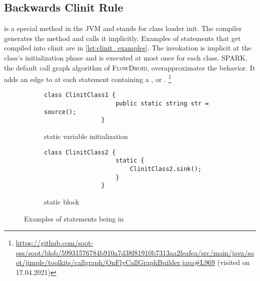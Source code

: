 \documentclass[../draft.tex]{subfiles}
\begin{document}
    \subsection{Backwards Clinit Rule}\label{s:clinitrule}
     is a special method in the JVM and stands for class loader init.
    The compiler generates the method and calls it implicitly. Examples of statements that get compiled into clinit are in \autoref{lst:clinit_examples}.
    The invokation is implicit at the class's initialization phase and is executed at most once for each class\footnotemark{}.
    SPARK, the default call graph algorithm of \textsc{FlowDroid}, overapproximates the  behavior.
    It adds an edge to  at each statement containing a ,  or \footnotemark{}.
    \footnote{\url{https://github.com/soot-oss/soot/blob/59931576784b910a7d38f81910b7313aa2feafea/src/main/java/soot/jimple/toolkits/callgraph/OnFlyCallGraphBuilder.java\#L969} (visited on 17.04.2021)}

    \begin{figure}[tbp]
        \centering
        \begin{subfigure}[b]{0.45\textwidth}
            \centering
            \begin{lstlisting}[gobble=16]
                class ClinitClass1 {
                    public static string str = source();
                }
            \end{lstlisting}
            \caption{static variable initialization}
            \label{lst:clinit_examples_a}
        \end{subfigure}
        \hfill
        \begin{subfigure}[b]{0.45\textwidth}
            \centering
            \begin{lstlisting}[gobble=16]
                class ClinitClass2 {
                    static {
                        ClinitClass2.sink();
                    }
                }
            \end{lstlisting}
            \caption{static block}
            \label{lst:clinit_examples_b}
        \end{subfigure}
        \caption{Examples of statements being in }
        \label{lst:clinit_examples}
    \end{figure}
\end{document}
